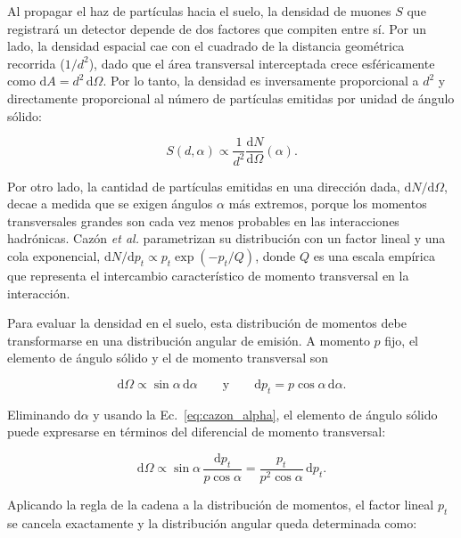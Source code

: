 Al propagar el haz de partículas hacia el suelo, la densidad de muones $S$ que registrará un detector depende de dos factores que compiten entre sí. Por un lado, la densidad espacial cae con el cuadrado de la distancia geométrica recorrida ($1/d^2$), dado que el área transversal interceptada crece esféricamente como $\mathrm{d}A = d^2\,\mathrm{d}\Omega$. Por lo tanto, la densidad es inversamente proporcional a $d^2$ y directamente proporcional al número de partículas emitidas por unidad de ángulo sólido:

\begin{equation}
	S(d, \alpha) \propto \frac{1}{d^2} \frac{\mathrm{d}N}{\mathrm{d}\Omega}(\alpha).
	\label{eq:asym_a1_previa}
\end{equation}

Por otro lado, la cantidad de partículas emitidas en una dirección dada, $\mathrm{d}N/\mathrm{d}\Omega$, decae a medida que se exigen ángulos $\alpha$ más extremos, porque los momentos transversales grandes son cada vez menos probables en las interacciones hadrónicas. Cazón \textit{et al.} \cite{Cazon2012} parametrizan su distribución con un factor lineal y una cola exponencial, $\mathrm{d}N/\mathrm{d}p_t \propto p_t \exp(-p_t/Q)$, donde $Q$ es una escala empírica que representa el intercambio característico de momento transversal en la interacción.

Para evaluar la densidad en el suelo, esta distribución de momentos debe transformarse en una distribución angular de emisión. A momento $p$ fijo, el elemento de ángulo sólido y el de momento transversal son

\begin{equation}
	\mathrm{d}\Omega \propto \sin\alpha\,\mathrm{d}\alpha
	\qquad \text{y} \qquad
	\mathrm{d}p_t = p\cos\alpha\,\mathrm{d}\alpha .
	\nonumber
\end{equation}

Eliminando $\mathrm{d}\alpha$ y usando la Ec.~\ref{eq:cazon_alpha}, el elemento de ángulo sólido puede expresarse en términos del diferencial de momento transversal:

\begin{equation}
	\mathrm{d}\Omega \propto \sin\alpha\,\frac{\mathrm{d}p_t}{p\cos\alpha} = \frac{p_t}{p^2\cos\alpha}\,\mathrm{d}p_t .
	\nonumber
\end{equation}

Aplicando la regla de la cadena a la distribución de momentos, el factor lineal $p_t$ se cancela exactamente y la distribución angular queda determinada como:

